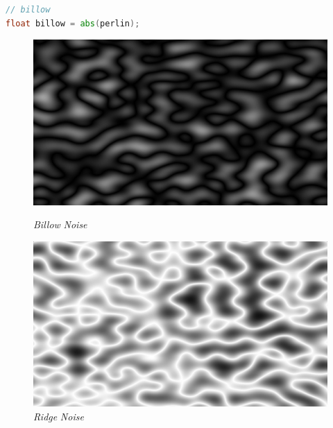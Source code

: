 \begin{minipage}{\linewidth}
\begin{lstlisting}[language=GLSL, caption=\textit{Billow noise},captionpos=b,frame=single]
// billow
float billow = abs(perlin);
\end{lstlisting}
\end{minipage}

\begin{figure}[h]
  \begin{minipage}[b]{0.45\linewidth}
    \centering
    \includegraphics[width=\linewidth]{images/noise/noise10billow.JPG}
    \caption{\textit{Billow} \textit{Noise}}
    \label{noise10}
  \end{minipage}
  \hspace{0.1\linewidth} %
  \begin{minipage}[b]{0.45\linewidth}
    \centering
    \includegraphics[width=\linewidth]{images/noise/noise11ridged.JPG}
    \caption{\textit{Ridge} \textit{Noise}}
    \label{noise11}
  \end{minipage}
\end{figure}



